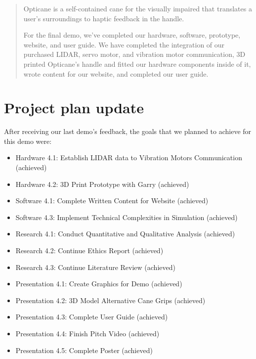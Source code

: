\documentclass{article}
\begin{document}
 



\begin{abstract} 
Opticane is a self-contained cane for the visually impaired that translates a user's surroundings to haptic feedback in the handle.

For the final demo, we've completed our hardware, software, prototype, website, and user guide. We have completed the integration of our purchased LIDAR, servo motor, and vibration motor communication, 3D printed Opticane's handle and fitted our hardware components inside of it, wrote content for our website, and completed our user guide.    
\end{abstract} 

\section{Project plan update} 

After receiving our last demo's feedback, the goals that we planned to achieve for this demo were:
\begin{itemize}
    \item Hardware 4.1: Establish LIDAR data to Vibration Motors Communication (achieved)
    \item Hardware 4.2: 3D Print Prototype with Garry (achieved)
    \item Software 4.1: Complete Written Content for Website (achieved)
    \item Software 4.3: Implement Technical Complexities in Simulation (achieved)
    \item Research 4.1: Conduct Quantitative and Qualitative Analysis (achieved)
    \item Research 4.2: Continue Ethics Report (achieved)
    \item Research 4.3: Continue Literature Review (achieved)
    \item Presentation 4.1: Create Graphics for Demo (achieved)
    \item Presentation 4.2: 3D Model Alternative Cane Grips (achieved)
    \item Presentation 4.3: Complete User Guide (achieved)
    \item Presentation 4.4: Finish Pitch Video (achieved)
    \item Presentation 4.5: Complete Poster (achieved)
    
\end{itemize}
\end{document}
